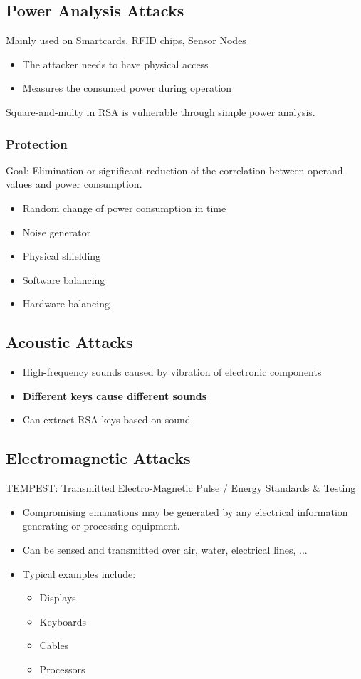 \subsection{Power Analysis Attacks}
Mainly used on Smartcards, RFID chips, Sensor Nodes
\begin{itemize}
  \item The attacker needs to have physical access
  \item Measures the consumed power during  operation
\end{itemize}
Square-and-multy in RSA is vulnerable through simple power analysis.
\subsubsection{Protection}
Goal: Elimination or significant reduction of the correlation between operand
values and power consumption.
\begin{itemize}
  \item Random change of power consumption in time
  \item Noise generator
  \item Physical shielding
  \item Software balancing
  \item Hardware balancing
\end{itemize}

\subsection{Acoustic Attacks}
\begin{itemize}
  \item High-frequency sounds caused by vibration of
    electronic components
  \item \textbf{Different keys cause different sounds}
  \item Can extract RSA keys based on sound
\end{itemize}

\subsection{Electromagnetic Attacks}
TEMPEST: Transmitted Electro-Magnetic Pulse / Energy
Standards \& Testing
\begin{itemize}
  \item Compromising emanations may be generated by any electrical information generating or processing equipment.
  \item Can be sensed and transmitted over air, water, electrical lines, ...
  \item Typical examples include:
    \begin{itemize}
      \item Displays
      \item Keyboards
      \item Cables
      \item Processors
    \end{itemize}
\end{itemize}
